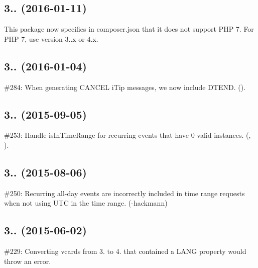 \subsection*{3.. (2016-\/01-\/11) }


\begin{DoxyItemize}
\item This package now specifies in composer.\+json that it does not support P\+HP 7. For P\+HP 7, use version 3..\+x or 4.\+x.
\end{DoxyItemize}

\subsection*{3.. (2016-\/01-\/04) }


\begin{DoxyItemize}
\item \#284\+: When generating {\ttfamily C\+A\+N\+C\+EL} i\+Tip messages, we now include {\ttfamily D\+T\+E\+ND}. ().
\end{DoxyItemize}

\subsection*{3.. (2015-\/09-\/05) }


\begin{DoxyItemize}
\item \#253\+: Handle {\ttfamily is\+In\+Time\+Range} for recurring events that have 0 valid instances. (, ).
\end{DoxyItemize}

\subsection*{3.. (2015-\/08-\/06) }


\begin{DoxyItemize}
\item \#250\+: Recurring all-\/day events are incorrectly included in time range requests when not using U\+TC in the time range. (-\/hackmann)
\end{DoxyItemize}

\subsection*{3.. (2015-\/06-\/02) }


\begin{DoxyItemize}
\item \#229\+: Converting vcards from 3. to 4. that contained a {\ttfamily L\+A\+NG} property would throw an error.
\end{DoxyItemize}

